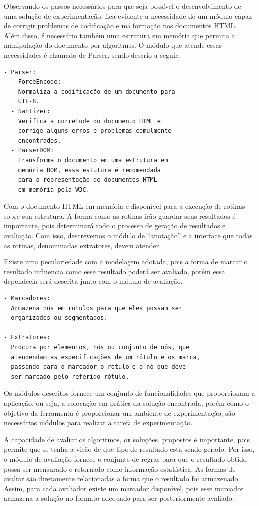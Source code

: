 \documentclass[12pt, a4paper]{article}
\begin{document}

Observando os passos necessários para que seja possível o 
desenvolvimento de uma solução de experimentação, fica evidente a
necessidade de um módulo capaz de corrigir problemas de
codificação e má formação nos documentos HTML. Além
disso, é necessário também uma estrutura em memória que permita a
manipulação do documento por algoritmos.
O módulo que atende essas necessidades é chamado de Parser, sendo 
descrio a seguir:

\begin{verbatim}
- Parser: 
  - ForceEncode:
    Normaliza a codificação de um documento para
    UTF-8.
  - Santizer:
    Verifica a corretude do documento HTML e
    corrige alguns erros e problemas comulmente
    encontrados.
  - ParserDOM:
    Transforma o documento em uma estrutura em
    memória DOM, essa estutura é recomendada
    para a representação de documentos HTML
    em memória pela W3C.
\end{verbatim}

Com o documento HTML em memória e disponível para a execução de rotinas
sobre sua estrutura. A forma como as rotinas irão guardar seus resultados
é importante, pois determinará todo o processo de geração de resultados
e avaliação. Com isso, descrevemos o módulo de ``anotação'' e a interface
que todas as rotinas, denominadas extratores, devem atender.

Existe uma peculariedade com a modelagem adotada, pois a forma de marcar
o resultado influencia como esse resultado poderá ser avaliado, porém
essa dependecia será descrita junto com o módulo de avaliação.

\begin{verbatim}
- Marcadores:
  Armazena nós em rótulos para que eles possam ser
  organizados ou segmentados.

- Extratores:
  Procura por elementos, nós ou conjunto de nós, que
  atendendam as especificações de um rótulo e os marca,
  passando para o marcador o rótulo e o nó que deve
  ser marcado pelo referido rótulo.
\end{verbatim}

Os módulos descritos fornece um conjunto de
funcionalidades que proporcionam a aplicação, ou seja, a colocação em
prática da solução encontrada,
porém como o objetivo da ferramenta é proporcionar um ambiente
de experimentação, são necessários módulos para realizar a tarefa de experimentação.

A capacidade de avaliar os algoritmos, ou soluções, propostos é
importante, pois permite que se tenha a visão de que tipo de resultado
esta sendo gerado. Por isso, o módulo de avaliação fornece o conjunto de
regras para que o resultado obtido possa ser mensurado e retornado como
informação estatística. As formas de avaliar são diretamente
relacionadas a forma que o resultado foi armazenado. Assim, para cada
avaliador existe um marcador disponível, pois esse marcador armazena a
solução no formato adequado para ser posteriormente avaliado.
\end{document}
